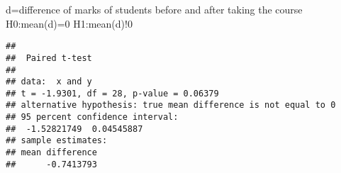 \documentclass[
]{article}
\newenvironment{Shaded}{\begin{snugshade}}{\end{snugshade}}
\newcommand{\AttributeTok}[1]{\textcolor[rgb]{0.77,0.63,0.00}{#1}}
\newcommand{\ConstantTok}[1]{\textcolor[rgb]{0.00,0.00,0.00}{#1}}
\newcommand{\FloatTok}[1]{\textcolor[rgb]{0.00,0.00,0.81}{#1}}
\newcommand{\FunctionTok}[1]{\textcolor[rgb]{0.00,0.00,0.00}{#1}}
\newcommand{\NormalTok}[1]{#1}
\newcommand{\OtherTok}[1]{\textcolor[rgb]{0.56,0.35,0.01}{#1}}
\newcommand{\SpecialCharTok}[1]{\textcolor[rgb]{0.00,0.00,0.00}{#1}}
\newcommand{\StringTok}[1]{\textcolor[rgb]{0.31,0.60,0.02}{#1}}
\begin{document}
d=difference of marks of students before and after taking the course
H0:mean(d)=0 H1:mean(d)!0

\begin{Shaded}
\end{Shaded}

\begin{verbatim}
## 
##  Paired t-test
## 
## data:  x and y
## t = -1.9301, df = 28, p-value = 0.06379
## alternative hypothesis: true mean difference is not equal to 0
## 95 percent confidence interval:
##  -1.52821749  0.04545887
## sample estimates:
## mean difference 
##      -0.7413793
\end{verbatim}
\end{document}
